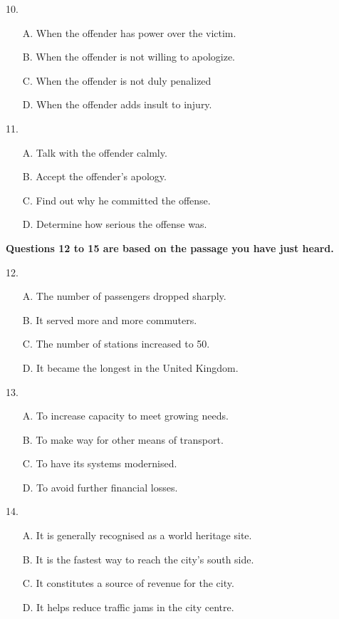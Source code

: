 \documentclass[UTF8,11pt]{ctexart}
\begin{document}
10.


\begin{itemize}[leftmargin=2em,itemsep=.2em,topsep=.4em]\item[A.] When the offender has power over the victim.
\item[B.] When the offender is not willing to apologize.
\item[C.] When the offender is not duly penalized
\item[D.] When the offender adds insult to injury.
\end{itemize}

11.


\begin{itemize}[leftmargin=2em,itemsep=.2em,topsep=.4em]\item[A.] Talk with the offender calmly.
\item[B.] Accept the offender’s apology.
\item[C.] Find out why he committed the offense.
\item[D.] Determine how serious the offense was.
\end{itemize}

\textbf{Questions 12 to 15 are based on the passage you have just heard.}


12.


\begin{itemize}[leftmargin=2em,itemsep=.2em,topsep=.4em]\item[A.] The number of passengers dropped sharply.
\item[B.] It served more and more commuters.
\item[C.] The number of stations increased to 50.
\item[D.] It became the longest in the United Kingdom.
\end{itemize}

13.


\begin{itemize}[leftmargin=2em,itemsep=.2em,topsep=.4em]\item[A.] To increase capacity to meet growing needs.
\item[B.] To make way for other means of transport.
\item[C.] To have its systems modernised.
\item[D.] To avoid further financial losses.
\end{itemize}

14.


\begin{itemize}[leftmargin=2em,itemsep=.2em,topsep=.4em]\item[A.] It is generally recognised as a world heritage site.
\item[B.] It is the fastest way to reach the city’s south side.
\item[C.] It constitutes a source of revenue for the city.
\item[D.] It helps reduce traffic jams in the city centre.
\end{itemize}
\end{document}
